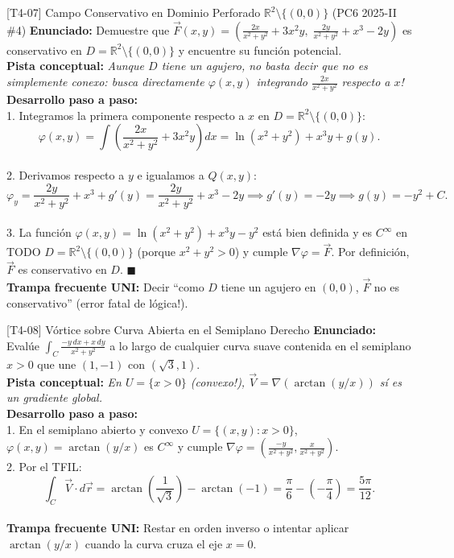 \documentclass[11pt,a4paper]{article}
\begin{document}
\begin{ejerciciobox}{[T4-07] Campo Conservativo en Dominio Perforado $\mathbb{R}^2 \setminus \{(0,0)\}$ (PC6 2025-II \#4)}
\textbf{Enunciado:} Demuestre que $\vec{F}(x,y) = \left(\frac{2x}{x^2+y^2} + 3x^2y,\; \frac{2y}{x^2+y^2} + x^3 - 2y\right)$ es conservativo en $D = \mathbb{R}^2 \setminus \{(0,0)\}$ y encuentre su función potencial.\\[0.2cm]
\textbf{Pista conceptual:} \emph{Aunque $D$ tiene un agujero, no basta decir que no es simplemente conexo: busca directamente $\varphi(x,y)$ integrando $\frac{2x}{x^2+y^2}$ respecto a $x$!}\\[0.2cm]
\textbf{Desarrollo paso a paso:}\\
1. Integramos la primera componente respecto a $x$ en $D = \mathbb{R}^2 \setminus \{(0,0)\}$:\\
$$\varphi(x,y) = \int \left(\frac{2x}{x^2+y^2} + 3x^2y\right)dx = \ln(x^2+y^2) + x^3y + g(y).$$\\
2. Derivamos respecto a $y$ e igualamos a $Q(x,y)$:\\
$$\varphi_y = \frac{2y}{x^2+y^2} + x^3 + g'(y) = \frac{2y}{x^2+y^2} + x^3 - 2y \implies g'(y) = -2y \implies g(y) = -y^2 + C.$$\\
3. La función $\varphi(x,y) = \ln(x^2+y^2) + x^3y - y^2$ está bien definida y es $C^\infty$ en TODO $D = \mathbb{R}^2 \setminus \{(0,0)\}$ (porque $x^2+y^2 > 0$) y cumple $\nabla\varphi = \vec{F}$. Por definición, $\vec{F}$ es conservativo en $D$. $\blacksquare$\\[0.2cm]
\textbf{Trampa frecuente UNI:} Decir ``como $D$ tiene un agujero en $(0,0)$, $\vec{F}$ no es conservativo'' (error fatal de lógica!).
\end{ejerciciobox}

\begin{ejerciciobox}{[T4-08] Vórtice sobre Curva Abierta en el Semiplano Derecho}
\textbf{Enunciado:} Evalúe $\int_C \frac{-y\,dx + x\,dy}{x^2+y^2}$ a lo largo de cualquier curva suave contenida en el semiplano $x > 0$ que une $(1, -1)$ con $(\sqrt{3}, 1)$.\\[0.2cm]
\textbf{Pista conceptual:} \emph{En $U = \{x > 0\}$ (convexo!), $\vec{V} = \nabla(\arctan(y/x))$ sí es un gradiente global.}\\[0.2cm]
\textbf{Desarrollo paso a paso:}\\
1. En el semiplano abierto y convexo $U = \{(x,y) : x > 0\}$, $\varphi(x,y) = \arctan(y/x)$ es $C^\infty$ y cumple $\nabla\varphi = \left(\frac{-y}{x^2+y^2}, \frac{x}{x^2+y^2}\right)$.\\
2. Por el TFIL:\\
$$\int_C \vec{V}\cdot d\vec{r} = \arctan\left(\frac{1}{\sqrt{3}}\right) - \arctan(-1) = \frac{\pi}{6} - \left(-\frac{\pi}{4}\right) = \frac{5\pi}{12}.$$\\[0.2cm]
\textbf{Trampa frecuente UNI:} Restar en orden inverso o intentar aplicar $\arctan(y/x)$ cuando la curva cruza el eje $x = 0$.
\end{ejerciciobox}
\end{document}
